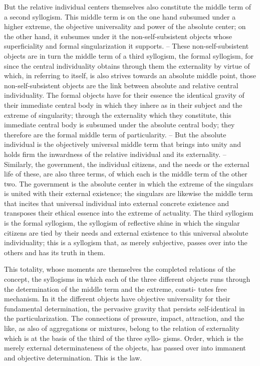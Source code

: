 But the relative individual centers themselves also constitute the middle
term of a second syllogism. This middle term is on the one hand subsumed
under a higher extreme, the objective universality and power of the absolute
center; on the other hand, it subsumes under it the non-self-subsistent
objects whose superficiality and formal singularization it supports. – These
non-self-subsistent objects are in turn the middle term of a third syllogism,
the formal syllogism, for since the central individuality obtains through
them the externality by virtue of which, in referring to itself, is also strives
towards an absolute middle point, those non-self-subsistent objects are the
link between absolute and relative central individuality. The formal objects
have for their essence the identical gravity of their immediate central body
in which they inhere as in their subject and the extreme of singularity;
through the externality which they constitute, this immediate central body
is subsumed under the absolute central body; they therefore are the formal
middle term of particularity. – But the absolute individual is the objectively
universal middle term that brings into unity and holds firm the inwardness
of the relative individual and its externality. – Similarly, the government, the
individual citizens, and the needs or the external life of these, are also three
terms, of which each is the middle term of the other two. The government is
the absolute center in which the extreme of the singulars is united with their
external existence; the singulars are likewise the middle term that incites
that universal individual into external concrete existence and transposes
their ethical essence into the extreme of actuality. The third syllogism is
the formal syllogism, the syllogism of reflective shine in which the singular
citizens are tied by their needs and external existence to this universal
absolute individuality; this is a syllogism that, as merely subjective, passes
over into the others and has its truth in them.

This totality, whose moments are themselves the completed relations of
the concept, the syllogisms in which each of the three different objects runs
through the determination of the middle term and the extreme, consti-
tutes free mechanism. In it the different objects have objective universality
for their fundamental determination, the pervasive gravity that persists
self-identical in the particularization. The connections of pressure, impact,
attraction, and the like, as also of aggregations or mixtures, belong to the
relation of externality which is at the basis of the third of the three syllo-
gisms. Order, which is the merely external determinateness of the objects,
has passed over into immanent and objective determination. This is the
law.

